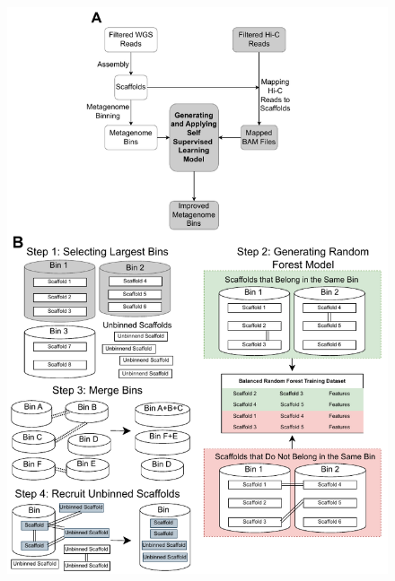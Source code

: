 \documentclass[fleqn,10pt,lineno]{wlpeerj}
\begin{document}
\begin{figure}
\centering
\includegraphics[scale=0.9]{Fig1.pdf}

\end{figure}
\end{document}
